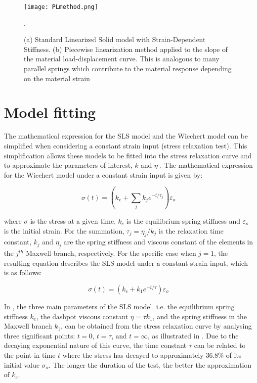 \begin{figure}[htb!]
	\centering
    \texttt{[image: PLmethod.png]}
    \caption{(a) Standard Linearized Solid model with Strain-Dependent Stiffness. (b) Piecewise linearization method applied to the slope of the material load-displacement curve. This is analogous to many parallel springs which contribute to the material response depending on the material strain \cite{austin2015control}}.
    \label{fig:PLmethod}
\end{figure}

\section{Model fitting} \label{sec:Modelfit}

The mathematical expression for the SLS model and the Wiechert model can be simplified when considering a constant strain input (stress relaxation test). This simplification allows these models to be fitted into the stress relaxation curve and to approximate the parameters of interest, $k$ and $\eta$ \cite{roylance2001engineering}. The mathematical expression for the Wiechert model under a constant strain input is given by:

\begin{equation}
\label{eq1}
\sigma (t) = \left( k_e +  \sum_{j} k_j e^{-t/\tau_j} \right)  \varepsilon_o
\end{equation}

\noindent where $\sigma$ is the stress at a given time, $k_e$ is the equilibrium spring stiffness and $\varepsilon_o$ is the initial strain. For the summation, $\tau_j=\eta_j/k_j$ is the relaxation time constant, $k_j$ and $\eta_j$ are the spring stiffness and viscous constant of the elements in the $j^{th}$ Maxwell branch, respectively. For the specific case when $j = 1$, the resulting equation describes the SLS model under a constant strain input, which is as follows:

\begin{equation}
\label{eq11}
\sigma(t) = \left( k_e +  k_1 e^{-t/\tau} \right)  \varepsilon_o
\end{equation}


In , the three main parameters of the SLS model. i.e. the equilibrium spring stiffness $k_e$, the dashpot viscous constant $\eta = \tau k_1$, and the spring stiffness in the Maxwell branch $k_1$, can be obtained from the stress relaxation curve by analysing three significant points: $t=0$, $t=\tau$, and $t=\infty$, as illustrated in . Due to the decaying exponential nature of this curve, the time constant $\tau$ can be related to the point in time $t$ where the stress has decayed to approximately 36.8\% of its initial value $\sigma_o$. The longer the duration of the test, the better the approximation of $k_e$.

